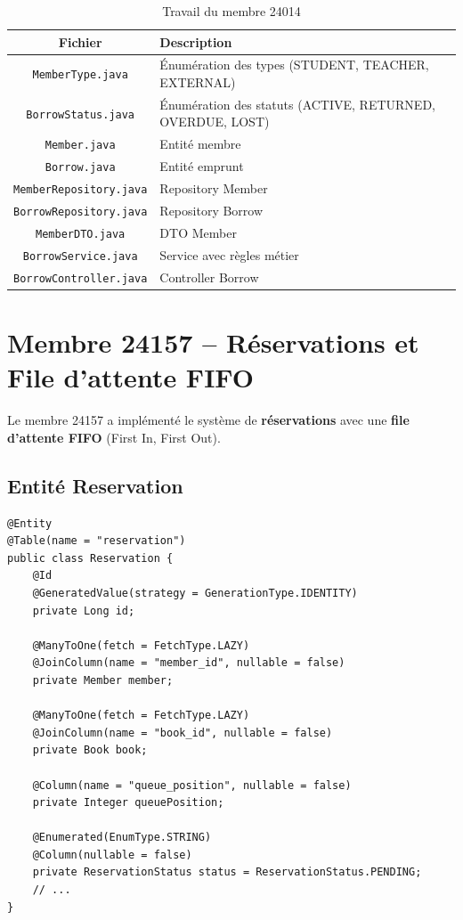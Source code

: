 \documentclass[12pt,a4paper,twoside]{report}
\begin{document}
\begin{table}[H]
\centering
\caption{Travail du membre 24014}
\begin{tabularx}{\textwidth}{c X}
\hline
\rowcolor[gray]{0.9}
\textbf{Fichier} & \textbf{Description} \\
\hline
\texttt{MemberType.java} & Énumération des types (STUDENT, TEACHER, EXTERNAL) \\
\texttt{BorrowStatus.java} & Énumération des statuts (ACTIVE, RETURNED, OVERDUE, LOST) \\
\texttt{Member.java} & Entité membre \\
\texttt{Borrow.java} & Entité emprunt \\
\texttt{MemberRepository.java} & Repository Member \\
\texttt{BorrowRepository.java} & Repository Borrow \\
\texttt{MemberDTO.java} & DTO Member \\
\texttt{BorrowService.java} & Service avec règles métier \\
\texttt{BorrowController.java} & Controller Borrow \\
\hline
\end{tabularx}
\end{table}

\section{Membre 24157 -- Réservations et File d'attente FIFO}

Le membre 24157 a implémenté le système de \textbf{réservations} avec une \textbf{file d'attente FIFO} (First In, First Out).

\subsection{Entité Reservation}

\begin{lstlisting}[caption=Entité Reservation]
@Entity
@Table(name = "reservation")
public class Reservation {
    @Id
    @GeneratedValue(strategy = GenerationType.IDENTITY)
    private Long id;

    @ManyToOne(fetch = FetchType.LAZY)
    @JoinColumn(name = "member_id", nullable = false)
    private Member member;

    @ManyToOne(fetch = FetchType.LAZY)
    @JoinColumn(name = "book_id", nullable = false)
    private Book book;

    @Column(name = "queue_position", nullable = false)
    private Integer queuePosition;

    @Enumerated(EnumType.STRING)
    @Column(nullable = false)
    private ReservationStatus status = ReservationStatus.PENDING;
    // ...
}
\end{lstlisting}
\end{document}
